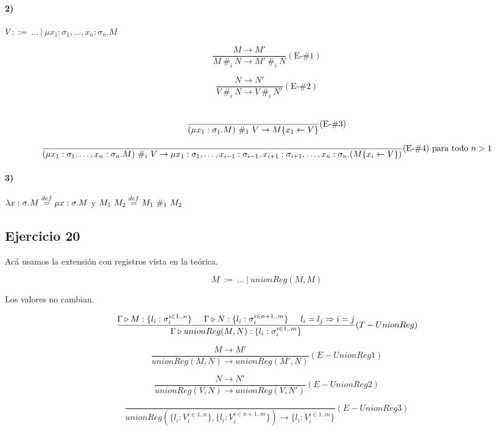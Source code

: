 \documentclass[10pt,a4paper, landscape]{article}
\begin{document}
\vspace*{5mm}
\paragraph{2)} $V~::=~\dots~|~\mu x_1:\sigma_1,\dots,x_n:\sigma_n.M$
\begin{multicols}{2}
$$\frac{M\to M'}{M~\#_i~N \to M'~\#_i~N}(\text{E-}\#1)$$

\vspace*{5mm}
$$\frac{N\to N'}{V~\#_i~N \to V~\#_i~N'}(\text{E-}\#2)$$\

$$\frac{}{(\mu x_1:\sigma_1.M)~\#_1~V \to M\{x_1\leftarrow V\}}(\text{E-}\#3)$$
\vfill

\end{multicols}
\vspace*{5mm}
$$\frac{}{(\mu x_1:\sigma_1,\dots,x_n:\sigma_n.M)~\#_i~V \to \mu x_1:\sigma_1,\dots,x_{i-1}:\sigma_{i-1},x_{i+1}:\sigma_{i+1},\dots,x_n:\sigma_n.(M\{x_i\leftarrow V\})}(\text{E-}\#4) \text{ para todo } n > 1$$

\paragraph{3)} $\lambda x: \sigma \text{.} M\overset{def}{=} \mu x:\sigma.M$ y $M_1~M_2\overset{def}{=} M_1~\#_1~M_2$

\newpage
\subsection{Ejercicio 20}
Acá usamos la extensión con registros vista en la teórica.

$$M~:=~\dots~|~unionReg(M,M)$$

Los valores no cambian.

$$\frac{\Gamma\triangleright M : \{l_i:\sigma_i^{i\in 1..n}\}\hspace*{5mm}\Gamma\triangleright N : \{l_i:\sigma_i^{i\in n+1..m}\}\hspace*{5mm}l_i=l_j \Rightarrow i = j}{\Gamma\triangleright unionReg(M,N) : \{l_i:\sigma_i^{i\in 1..m}\}}(T-UnionReg)$$

\begin{multicols}{2}

\vspace*{5mm}
$$\frac{M\to M'}{unionReg(M,N)\to unionReg(M',N)}(E-UnionReg1)$$

\vspace*{5mm}
$$\frac{N\to N'}{unionReg(V,N)\to unionReg(V,N')}(E-UnionReg2)$$

\vspace*{5mm}
$$\frac{}{unionReg(\{l_i:V_i^{i\in 1..n}\},\{l_i:V_i^{i\in n+1..m}\})\to \{l_i:V_i^{i\in 1..m}\}}(E-UnionReg3)$$
\end{multicols}
\end{document}
